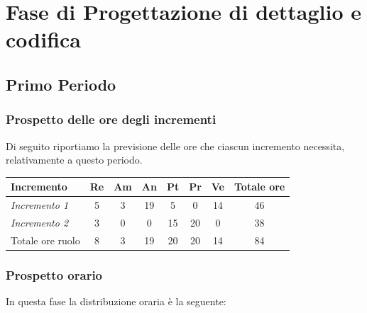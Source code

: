 {{{{{{\section{Fase di Progettazione di dettaglio e codifica}\label{PreventivoFaseDiProgettazioneDiDettaglioECodifica}

\subsection{Primo Periodo}\label{PreventivoFaseDiProgettazioneDiDettaglioECodificaPeriodo1}

\subsubsection{Prospetto delle ore degli incrementi}\label{PreventivoFaseDiProgettazioneDiDettaglioECodificaPeriodo1Incrementi}
Di seguito riportiamo la previsione delle ore che ciascun incremento necessita, relativamente a questo periodo.
\quad
\def\tabularxcolumn#1{m{#1}}
{

	\begin{center}
		\renewcommand{\arraystretch}{1.4}
		\begin{tabularx}{\textwidth}{|X|c|c|c|c|c|c|c|}
			\hline
			\rowcolor{airforceblue}
			\textbf{Incremento} & \textbf{Re} & \textbf{Am} & \textbf{An} & \textbf{Pt} & \textbf{Pr} & \textbf{Ve} & \textbf{Totale ore}\\
			\hline
			\textit{Incremento 1} & 5 & 3 & 19 & 5 & 0 & 14 & 46\\
			\hline
			\textit{Incremento 2} & 3 & 0 & 0 & 15 & 20 & 0 & 38\\
			\hline
			Totale ore ruolo & 8 & 3 & 19 & 20 & 20 & 14 & 84\\
			\hline
		\end{tabularx}
	\end{center}

\subsubsection{Prospetto orario}\label{PreventivoFaseDiProgettazioneDiDettaglioECodificaProspettoOrarioPeriodo1}
In questa fase la distribuzione oraria è la seguente:
\quad
\def\tabularxcolumn#1{m{#1}}
{

}}}}}}}}
